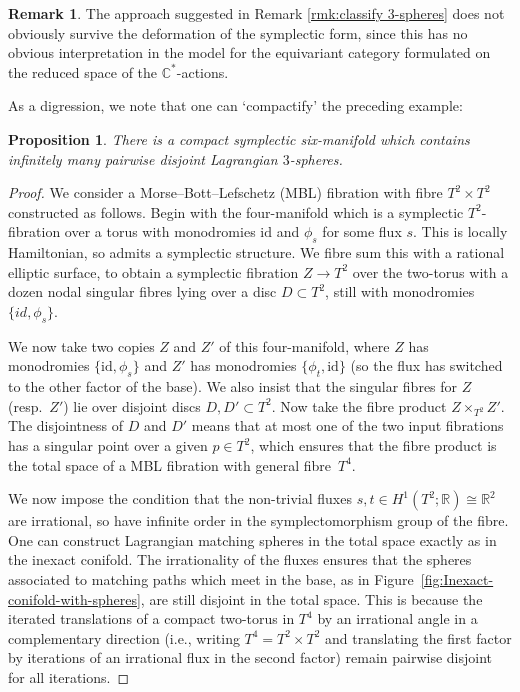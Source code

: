 \documentclass[10pt,a4paper]{amsart}
\def\bC{\mathbb{C}}
\def\bR{\mathbb{R}}
\newcommand{\id}{\mathrm{id}}
\newtheorem{prop}[thm]{Proposition}
\theoremstyle{definition}
\newtheorem{rmk}[thm]{Remark}
\numberwithin{equation}{section}
\begin{document}
\begin{rmk}
 The approach suggested in Remark \ref{rmk:classify 3-spheres} does not obviously survive the deformation of the symplectic form, since this has no obvious interpretation in the model for the equivariant category formulated on the reduced space of the $\bC^*$-actions.
\end{rmk}


 As a digression, we note that one can `compactify' the preceding example:


 \begin{prop}
 There is a compact symplectic six-manifold which contains infinitely many pairwise disjoint Lagrangian $3$-spheres.
 \end{prop}


\begin{proof}
 We consider a Morse--Bott--Lefschetz (MBL) fibration with fibre $T^2\times T^2$ constructed as follows. Begin with the four-manifold which is a symplectic $T^2$-fibration over a torus with monodromies $\id$ and $\phi_s$ for some flux $s$. This is locally Hamiltonian, so admits a symplectic structure. We fibre sum this with a rational elliptic surface, to obtain a symplectic fibration $Z \to T^2$ over the two-torus with a dozen nodal singular fibres lying over a disc $D \subset T^2$, still with monodromies $\{id,\phi_s\}$.

 We now take two copies $Z$ and $Z'$ of this four-manifold, where $Z$ has monodromies $\{\id,\phi_s\}$ and $Z'$ has monodromies $\{\phi_t,\id\}$ (so the flux has switched to the other factor of the base). We also insist that the singular fibres for $Z$ (resp.~$Z'$) lie over disjoint discs $D,D' \subset T^2$. Now take the fibre product $Z \times_{T^2} Z'$. The disjointness of $D$ and $D'$ means that at most one of the two input fibrations has a singular point over a given $p\in T^2$, which ensures that the fibre product is the total space of a MBL fibration with general fibre~$T^4$.

 We now impose the condition that the non-trivial fluxes $s,t \in H^1(T^2;\bR) \cong \bR^2$ are irrational, so have infinite order in the symplectomorphism group of the fibre. One can construct Lagrangian matching spheres in the total space exactly as in the inexact conifold. The irrationality of the fluxes ensures that the spheres associated to matching paths which meet in the base, as in Figure~\ref{fig:Inexact-conifold-with-spheres}, are still disjoint in the total space. This is because the iterated translations of a compact two-torus in $T^4$ by an irrational angle in a complementary direction (i.e., writing $T^4 = T^2 \times T^2$ and translating the first factor by iterations of an irrational flux in the second factor) remain pairwise disjoint for all iterations.
\end{proof}
\end{document}
